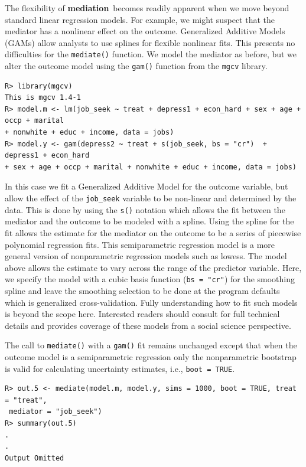 \documentclass[11pt,letterpaper]{article}
\theoremstyle{plain}
\newcommand\bmediation{{\bf mediation}}
\begin{document}
The flexibility of \bmediation\ becomes readily apparent when we move
beyond standard linear regression models.  For example, we might
suspect that the mediator has a nonlinear effect on the outcome.
Generalized Additive Models (GAMs) allow analysts to use splines for
flexible nonlinear fits.  This presents no difficulties for the
\texttt{mediate()} function.  We model the mediator as before, but we
alter the outcome model using the \texttt{gam()} function from the
\texttt{mgcv} library.
\begin{verbatim}
R> library(mgcv)
This is mgcv 1.4-1
R> model.m <- lm(job_seek ~ treat + depress1 + econ_hard + sex + age + occp + marital
+ nonwhite + educ + income, data = jobs)
R> model.y <- gam(depress2 ~ treat + s(job_seek, bs = "cr")  + depress1 + econ_hard
+ sex + age + occp + marital + nonwhite + educ + income, data = jobs)
\end{verbatim}
In this case we fit a Generalized Additive Model for the outcome
variable, but allow the effect of the \texttt{job\_seek} variable to
be non-linear and determined by the data. This is done by using the
\texttt{s()} notation which allows the fit between the mediator and
the outcome to be modeled with a spline.  Using the spline for the fit
allows the estimate for the mediator on the outcome to be a series of
piecewise polynomial regression fits. This semiparametric regression
model is a more general version of nonparametric regression models
such as lowess. The model above allows the estimate to vary across the
range of the predictor variable. Here, we specify the model with a
cubic basis function (\texttt{bs = "cr"}) for the smoothing spline and
leave the smoothing selection to be done at the program defaults which
is generalized cross-validation.  Fully understanding how to fit such
models is beyond the scope here.  Interested readers should consult
\cite{Wood:2006} for full technical details and \cite{Keele:2008}
provides coverage of these models from a social science perspective.

The call to \texttt{mediate()} with a \texttt{gam()} fit remains
unchanged except that when the outcome model is a semiparametric
regression only the nonparametric bootstrap is valid for calculating
uncertainty estimates, i.e., {\tt boot = TRUE}.
\begin{verbatim}
R> out.5 <- mediate(model.m, model.y, sims = 1000, boot = TRUE, treat = "treat",
 mediator = "job_seek")
R> summary(out.5)
.
.
Output Omitted
\end{verbatim}
\end{document}
